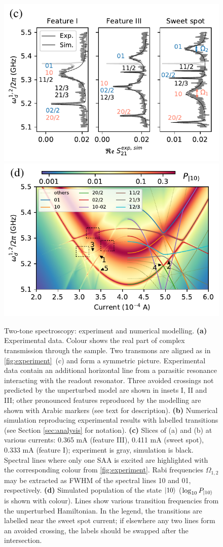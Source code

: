\documentclass[%
 aps, prx,
 amsmath,amssymb,
 reprint,%
superscriptaddress
]{revtex4-2}
\begin{document}
\begin{figure}
	\includegraphics[width=.495\linewidth]{main_picture_slices}
	\includegraphics[width=.495\linewidth]{stationary}
	\caption{Two-tone spectroscopy: experiment 
	and numerical modelling. \textbf{(a)} 
	Experimental data. Colour shows the real part 
	of complex transmission  through the sample. 
	Two transmons are aligned as in 
	\autoref{fig:experiment}~(c) and form a 
	symmetric picture. Experimental data contain 
	an additional horizontal line from a 
	parasitic resonance interacting with the 
	readout resonator. Three avoided crossings 
	not predicted by the unperturbed model are 
	shown in insets I, II and III; other 
	pronounced features reproduced by the 
	modelling are shown with Arabic markers (see 
	text for description). \textbf{(b)} Numerical 
	simulation reproducing experimental results 
	with labelled transitions (see Section 
	\ref{sec:analysis} for notation). 
	\textbf{(c)} Slices of (a) and (b) at various 
	currents: 0.365 mA (feature III), 0.411 mA 
	(sweet spot), 0.333 mA (feature I); 
	experiment is gray, simulation is black. 
	Spectral lines where only one SAA is excited 
	are highlighted with the corresponding colour 
	from \autoref{fig:experiment}. Rabi 
	frequencies $\Omega_{1,2}$ may be extracted 
	as FWHM of the spectral lines 10 and 01, 
	respectively. \textbf{(d)} Simulated 
	population of the state $\ket{10}$ ($\log_{10} 
	P_{\ket{10}}$ is shown with colour). Lines 
	show various transition frequencies from the 
	unperturbed Hamiltonian. In the legend, the 
	transitions are labelled near the sweet spot current; if 
	elsewhere any two lines form an avoided 
	crossing, the labels should be swapped after 
	the intersection.}
	\label{fig:two-tone}
\end{figure}
\end{document}
